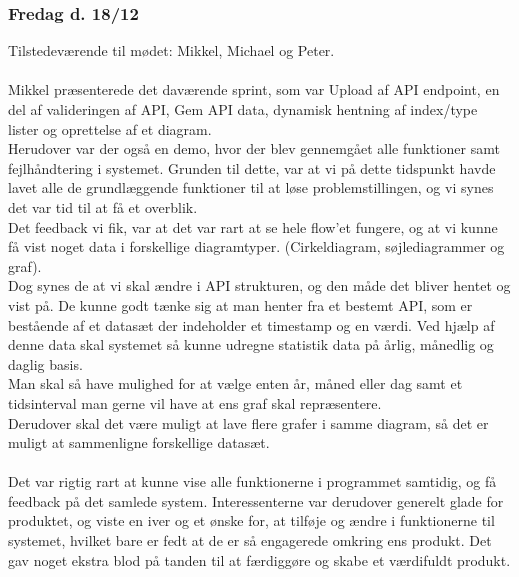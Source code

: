 \subsubsection{Fredag d. 18/12}
Tilstedeværende til mødet: Mikkel, Michael og Peter.
\\\\
Mikkel præsenterede det daværende sprint, som var Upload af API endpoint, en del af valideringen af API, Gem API data, dynamisk hentning af index/type lister og oprettelse af et diagram.\\
Herudover var der også en demo, hvor der blev gennemgået alle funktioner samt fejlhåndtering i systemet. Grunden til dette, var at vi på dette tidspunkt havde lavet alle de grundlæggende funktioner til at løse
problemstillingen, og vi synes det var tid til at få et overblik.\\
Det feedback vi fik, var at det var rart at se hele flow'et fungere, og at vi kunne få vist noget data i forskellige diagramtyper. (Cirkeldiagram, søjlediagrammer og graf).\\
Dog synes de at vi skal ændre i API strukturen, og den måde det bliver hentet og vist på.
De kunne godt tænke sig at man henter fra et bestemt API, som er bestående af et datasæt der indeholder et timestamp og en værdi. Ved hjælp af denne data skal systemet så kunne
udregne statistik data på årlig, månedlig og daglig basis.\\
Man skal så have mulighed for at vælge enten år, måned eller dag samt et tidsinterval man gerne vil have at ens graf skal repræsentere.\\
Derudover skal det være muligt at lave flere grafer i samme diagram, så det er muligt at sammenligne forskellige datasæt.\\\\
Det var rigtig rart at kunne vise alle funktionerne i programmet samtidig, og få feedback på det samlede system. Interessenterne var derudover generelt glade for produktet, og viste en iver og et
ønske for, at tilføje og ændre i funktionerne til systemet, hvilket bare er fedt at de er så engagerede omkring ens produkt. Det gav noget ekstra blod på tanden til at færdiggøre og skabe et værdifuldt
produkt.
